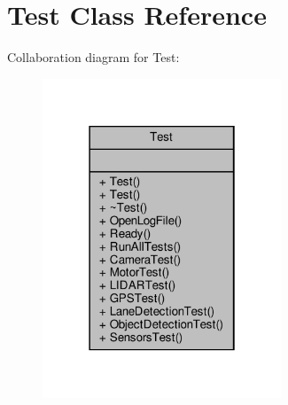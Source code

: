 \hypertarget{classTest}{}\section{Test Class Reference}
\label{classTest}


Collaboration diagram for Test\+:
\nopagebreak
\begin{figure}[H]
\begin{center}
\leavevmode
\includegraphics[width=202pt]{d2/da7/classTest__coll__graph}
\end{center}
\end{figure}
